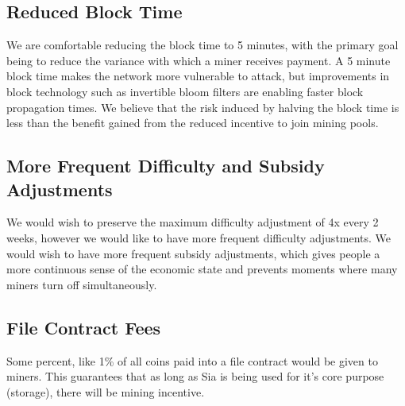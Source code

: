 \documentclass[twocolumn]{article}
\begin{document}
\subsection{Reduced Block Time}
We are comfortable reducing the block time to 5 minutes, with the primary goal being to reduce the variance with which a miner receives payment.
A 5 minute block time makes the network more vulnerable to attack, but improvements in block technology such as invertible bloom filters \cite{ibf} are enabling faster block propagation times.
We believe that the risk induced by halving the block time is less than the benefit gained from the reduced incentive to join mining pools.

\subsection{More Frequent Difficulty and Subsidy Adjustments}
We would wish to preserve the maximum difficulty adjustment of 4x every 2 weeks, however we would like to have more frequent difficulty adjustments.
We would wish to have more frequent subsidy adjustments, which gives people a more continuous sense of the economic state and prevents moments where many miners turn off simultaneously.



\subsection{File Contract Fees}
Some percent, like 1\% of all coins paid into a file contract would be given to miners.
This guarantees that as long as Sia is being used for it's core purpose (storage), there will be mining incentive.

\end{document}
